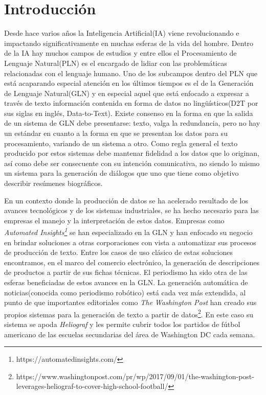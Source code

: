 \chapter*{Introducción}\label{chapter:introduction}

    Desde hace varios años la Inteligencia Artificial(IA) viene revolucionando e \\impactando significativamente en muchas esferas de la 
vida del hombre. Dentro de la IA hay muchos campos de estudios y entre ellos el Procesamiento de Lenguaje Natural(PLN) es 
el encargado de lidiar con las problem\'aticas relacionadas con el lenguaje humano. Uno de los subcampos dentro del PLN que está 
acaparando especial atención en los últimos tiempos es el de la Generación de Lenguaje Natural(GLN) y en especial aquel que está 
enfocado a expresar a través de texto información contenida en forma de datos no lingüísticos(D2T por sus siglas en inglés, Data-to-Text). 
Existe consenso en la forma en que la salida de un sistema de GLN debe presentarse: texto, valga la redundancia, pero no hay un est\'andar 
en cuanto a la forma en que se presentan los datos para su procesamiento, variando de un sistema a otro. Como regla general el 
texto producido por estos sistemas debe mantenar fidelidad a los datos que lo originan, así como debe ser consecuente con su intención 
comunicativa, no siendo lo mismo un sistema para la generación de diálogos que uno que tiene como objetivo describir resúmenes biográficos.

    En un contexto donde la producción de datos se ha acelerado resultado de los avances tecnológicos y de los sistemas industriales, se ha hecho necesario para 
las empresas el manejo y la interpretación de estos datos. Empresas como \\ \textit{Automated Insights\footnote[1]{https://automatedinsights.com/}} 
se han especializado en la GLN y han enfocado su negocio en brindar soluciones a otras corporaciones con vista a automatizar sus procesos de producción de texto. 
Entre los casos de uso clásico de estas soluciones encontramos, en el marco del comercio electr\'onico, la generación de descripciones de productos a partir de sus 
fichas técnicas. El periodismo ha sido otra de las esferas beneficiadas de estos avances en la GLN. La generación automática de noticias(conocida como periodismo robótico) 
está cada vez más extendida, al punto de que importantes editoriales como \textit{The Washington Post} han creado sus propios sistemas para la generación de texto a partir 
de datos\footnote[2]{https://www.washingtonpost.com/pr/wp/2017/09/01/the-washington-post-leverages-heliograf-to-cover-high-school-football/}. 
En este caso su sistema se apoda \textit{Heliograf} y les permite cubrir todos los partidos de fútbol americano de las escuelas secundarias del área de Washington DC 
cada semana.

